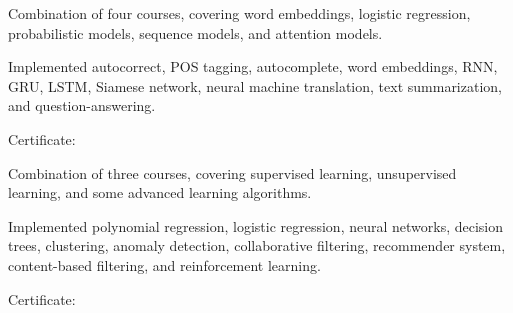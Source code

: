 \begin{resume_list}
  \item Combination of four courses, covering word embeddings, logistic regression, probabilistic models, sequence models, and attention models.
  \item Implemented autocorrect, POS tagging, autocomplete, word embeddings, RNN, GRU, LSTM, Siamese network, neural machine translation, text summarization, and question-answering.
  \item Certificate: 
\end{resume_list}

\begin{resume_list}
  \item Combination of three courses, covering supervised learning, unsupervised learning, and some advanced learning algorithms.
  \item Implemented polynomial regression, logistic regression, neural networks, decision trees, clustering, anomaly detection, collaborative filtering, recommender system, content-based filtering, and reinforcement learning.
  \item Certificate: 
\end{resume_list}
